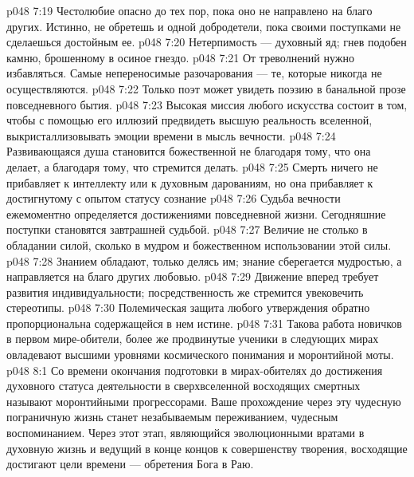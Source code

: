 \vs p048 7:19 \pc {}\bibnobreakspace Честолюбие опасно до тех пор, пока оно не направлено на благо других. Истинно, не обретешь и одной добродетели, пока своими поступками не сделаешься достойным ее.
\vs p048 7:20 \pc {}\bibnobreakspace Нетерпимость --- духовный яд; гнев подобен камню, брошенному в осиное гнездо.
\vs p048 7:21 \pc {}\bibnobreakspace От треволнений нужно избавляться. Самые непереносимые разочарования --- те, которые никогда не осуществляются.
\vs p048 7:22 \pc {}\bibnobreakspace Только поэт может увидеть поэзию в банальной прозе повседневного бытия.
\vs p048 7:23 \pc {}\bibnobreakspace Высокая миссия любого искусства состоит в том, чтобы с помощью его иллюзий предвидеть высшую реальность вселенной, выкристаллизовывать эмоции времени в мысль вечности.
\vs p048 7:24 \pc {}\bibnobreakspace Развивающаяся душа становится божественной не благодаря тому, что она делает, а благодаря тому, что стремится делать.
\vs p048 7:25 \pc {}\bibnobreakspace Смерть ничего не прибавляет к интеллекту или к духовным дарованиям, но она прибавляет к достигнутому с опытом статусу сознание 
\vs p048 7:26 \pc {}\bibnobreakspace Судьба вечности ежемоментно определяется достижениями повседневной жизни. Сегодняшние поступки становятся завтрашней судьбой.
\vs p048 7:27 \pc {}\bibnobreakspace Величие не столько в обладании силой, сколько в мудром и божественном использовании этой силы.
\vs p048 7:28 \pc {}\bibnobreakspace Знанием обладают, только делясь им; знание сберегается мудростью, а направляется на благо других любовью.
\vs p048 7:29 \pc {}\bibnobreakspace Движение вперед требует развития индивидуальности; посредственность же стремится увековечить стереотипы.
\vs p048 7:30 \pc {}\bibnobreakspace Полемическая защита любого утверждения обратно пропорциональна содержащейся в нем истине.
\vs p048 7:31 \pc Такова работа новичков в первом мире\hyp{}обители, более же продвинутые ученики в следующих мирах овладевают высшими уровнями космического понимания и моронтийной моты.
\vs p048 8:1 Со времени окончания подготовки в мирах\hyp{}обителях до достижения духовного статуса деятельности в сверхвселенной восходящих смертных называют моронтийными прогрессорами. Ваше прохождение через эту чудесную пограничную жизнь станет незабываемым переживанием, чудесным воспоминанием. Через этот этап, являющийся эволюционными вратами в духовную жизнь и ведущий в конце концов к совершенству творения, восходящие достигают цели времени --- обретения Бога в Раю.
